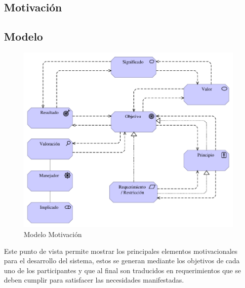 \begin{center}
  \begin{minipage}{1\textwidth}
\section{Motivación}

\subsection{Modelo}

\begin{figure}[H]
	\centering	
    \includegraphics[width=0.9\linewidth]{imgs/Modelo 6.pdf}
	\caption{Modelo Motivación}
\end{figure}


Este punto de vista permite mostrar los principales elementos motivacionales para el desarrollo del sistema, estos se generan mediante los objetivos de cada uno de los participantes y que al final son traducidos en requerimientos que se deben cumplir para satisfacer las necesidades manifestadas.



\end{minipage}
\end{center}
